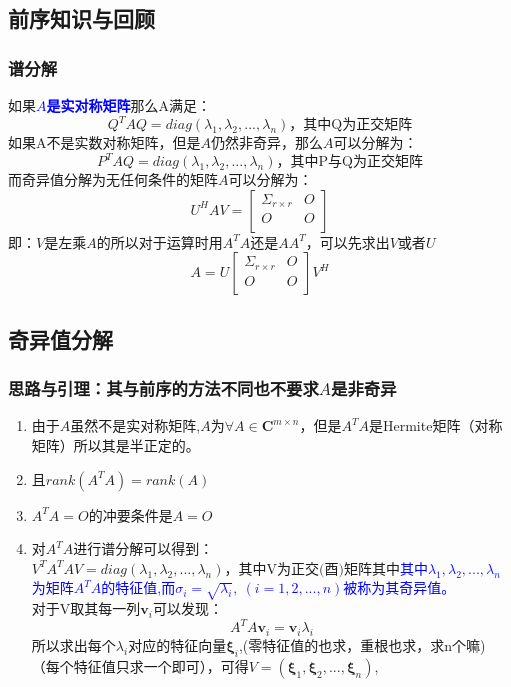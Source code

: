 \documentclass[12pt]{article}
\begin{document}
\begin{CJK*}{UTF8}{gbsn}
\subsection{前序知识与回顾}
\subsubsection{谱分解}
如果\textbf{\textcolor{blue}{$A$是实对称矩阵}}那么A满足：
\begin{equation}
	Q^TAQ=diag(\lambda_1,\lambda_2,...,\lambda_n)\mbox{，其中Q为正交矩阵}
\end{equation}
如果A不是实数对称矩阵，但是$A$仍然非奇异，那么$A$可以分解为：
\begin{equation}
	P^TAQ=diag(\lambda_1,\lambda_2,...,\lambda_n)\mbox{，其中P与Q为正交矩阵}
\end{equation}
而奇异值分解为无任何条件的矩阵$A$可以分解为：
\begin{equation}
	U^HAV=\begin{bmatrix}
	\Sigma_{r\times r} &O  \\
	O&  O\\
\end{bmatrix}
\end{equation}
即：$V$是左乘$A$的所以对于运算时用$A^TA$还是$AA^T$，可以先求出$V$或者$U$
\begin{equation}
	A=U\begin{bmatrix}
	\Sigma_{r\times r} &O  \\
	O&  O\\
\end{bmatrix}V^H
\end{equation}

\subsection{奇异值分解}
\subsubsection{思路与引理：其与前序的方法不同也不要求$A$是非奇异}
\begin{enumerate}
	\item 由于$A$虽然不是实对称矩阵,$A$为$\forall A\in \bm C^{m\times n} $，但是$A^TA$是Hermite矩阵（对称矩阵）所以其是半正定的。
	\item 且$rank(A^TA)=rank(A)$
	\item $A^TA=O$的冲要条件是$A=O$
	\item 对$A^TA$进行谱分解可以得到：$V^TA^TAV=diag(\lambda_1,\lambda_2,...,\lambda_n)\mbox{，其中V为正交(酉)矩阵}$其中\textcolor{blue}{其中$\lambda_1,\lambda_2,...,\lambda_n$为矩阵$A^TA$的特征值,而$\sigma_i=\sqrt{\lambda_i},~(i=1,2,...,n)$被称为其奇异值。}\\
对于V取其每一列$\bm v_i$可以发现：
	\begin{equation}
		A^TA\bm v_i=\bm v_i\lambda_i
	\end{equation}
	所以求出每个$\lambda_i$对应的特征向量$\bm \xi_i$,(零特征值的也求，重根也求，求n个嘛)（每个特征值只求一个即可），可得$V=(\bm\xi_1,\bm\xi_2,...,\bm\xi_n)$,
\end{enumerate}

\end{CJK*}
\end{document}
